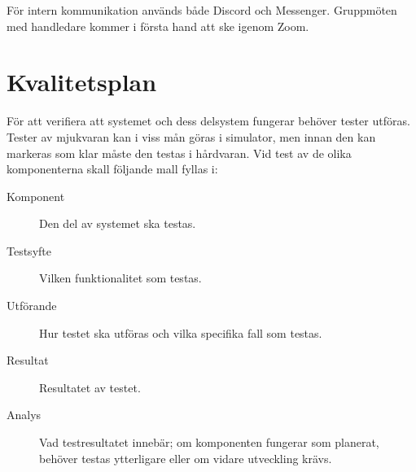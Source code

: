 \documentclass[a4paper]{article}
\begin{document}
För intern kommunikation används både Discord och Messenger. Gruppmöten med handledare kommer i första hand att ske igenom Zoom.

\section{Kvalitetsplan}

För att verifiera att systemet och dess delsystem fungerar behöver tester utföras. Tester av mjukvaran kan i viss mån göras i simulator, men innan den kan markeras som klar måste den testas i hårdvaran. Vid test av de olika komponenterna skall följande mall fyllas i:

\begin{description}
\item[Komponent] Den del av systemet ska testas.

\item[Testsyfte] Vilken funktionalitet som testas.

\item[Utförande] Hur testet ska utföras och vilka specifika fall som testas.

\item[Resultat] Resultatet av testet.

\item[Analys] Vad testresultatet innebär; om komponenten fungerar som planerat, behöver testas ytterligare eller om vidare utveckling krävs.
\end{description}




\end{document}
